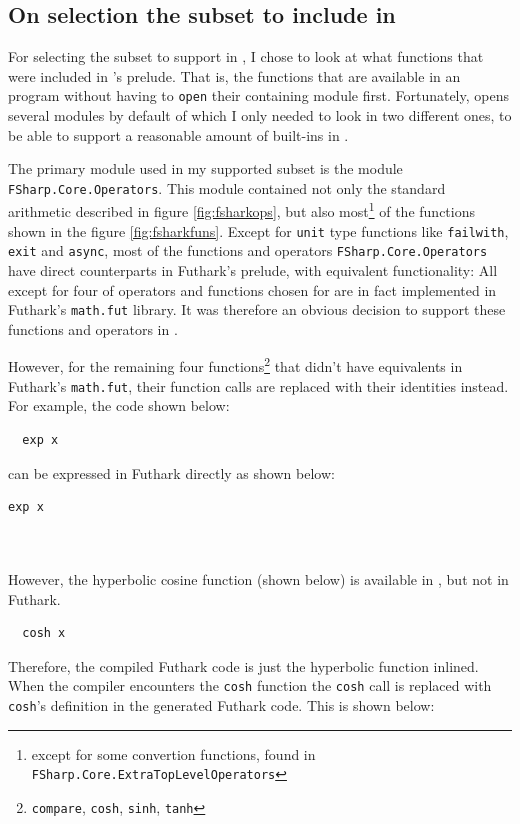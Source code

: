 \subsection{On selection the \fsharp{} subset to include in \fshark{}}
For selecting the \fsharp{} subset to support in \fshark{}, I chose to look at
what functions that were included in \fsharp{}'s prelude. That is, the
functions that are available in an \fsharp{} program without having to
\texttt{open} their containing module first.
Fortunately, \fsharp{} opens several modules by default of which I only
needed to look in two different ones, to be able to support a reasonable amount
of \fsharp{} built-ins in \fshark{}.

The primary module used in my supported \fsharp{} subset is the module
\texttt{FSharp.Core.Operators}.
This module contained not only the standard arithmetic described in figure
\ref{fig:fsharkops}, but also most\footnote{except for some convertion
  functions, found in \texttt{FSharp.Core.ExtraTopLevelOperators}} of the functions shown in the figure \ref{fig:fsharkfuns}.
Except for \texttt{unit} type functions like \texttt{failwith}, \texttt{exit}
and \texttt{async}, most of the functions and operators
\texttt{FSharp.Core.Operators} have direct counterparts in Futhark's prelude,
with equivalent functionality: All except for four of operators and functions chosen for
\fshark{} are in fact implemented in Futhark's \texttt{math.fut} library.
It was therefore an obvious decision to support these functions and operators in
\fshark{}.

However, for the remaining four functions\footnote{\texttt{compare}, \texttt{cosh}, \texttt{sinh}, \texttt{tanh}} that didn't have equivalents in
Futhark's \texttt{math.fut}, their function calls are replaced with their
identities instead.
For example, the \fshark{} code shown below:
\begin{verbatim}
  exp x
\end{verbatim}

can be expressed in Futhark directly as shown below:
\begin{lstlisting}[language=Futhark]
  exp x
\end{lstlisting}
\\
\\
However, the hyperbolic cosine function (shown below) is available in \fsharp{}, but not in Futhark.
\begin{verbatim}
  cosh x
\end{verbatim}
Therefore, the compiled \fshark{} Futhark code is just the hyperbolic function
inlined.
When the \fshark{} compiler encounters the \texttt{cosh} function the \texttt{cosh} call is replaced with
  \texttt{cosh}'s definition in the \fshark{} generated Futhark code. This is
  shown below:
  
